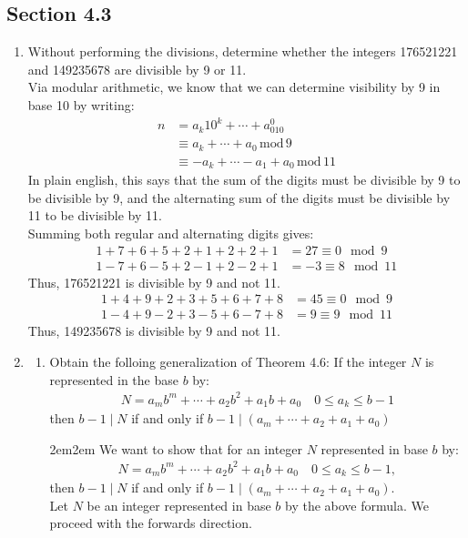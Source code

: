 \documentclass[10pt,oneside]{book}
\newcommand{\gspc}{\vspace{0.13cm}} %
\newcommand{\gline}{\gspc\\} %
\newcommand{\gmod}{\,\text{mod}\,}
\let\endoldproof\endproof
\renewenvironment{proof}[1][\proofname]
  {\vspace{0.2cm}\begin{adjustwidth}{2em}{2em}
   \oldproof[#1]}
  {\endoldproof
\end{adjustwidth}}
\begin{document}
\subsection*{Section 4.3}
\begin{enumerate}
	\item [4.] Without performing the divisions, determine whether the integers 176521221 and 149235678 are divisible by 9 or 11. \gline
	Via modular arithmetic, we know that we can determine visibility by 9 in base 10 by writing:
	\begin{align*}
		n &= a_k10^k+\cdots+a_010^0\\
		&\equiv a_k + \cdots +a_0 \gmod 9\\
		&\equiv -a_k + \cdots -a_1+a_0 \gmod 11
	\end{align*}
	In plain english, this says that the sum of the digits must be divisible by 9 to be divisible by 9, and the alternating sum of the digits must be divisible by 11 to be divisible by 11. \gline
	Summing both regular and alternating digits gives:
	\begin{align*}
		1+7+6+5+2+1+2+2+1 &= 27\equiv 0 \mod 9\\
		1-7+6-5+2-1+2-2+1 &= -3 \equiv 8\mod 11
	\end{align*}
	Thus, 176521221 is divisible by 9 and not 11.
	\begin{align*}
		1+4+9+2+3+5+6+7+8 &= 45\equiv 0 \mod 9\\
		1-4+9-2+3-5+6-7+8 &= 9 \equiv 9 \mod 11
	\end{align*}
	Thus, 149235678 is divisible by 9 and not 11. 
	\item [5.] \begin{enumerate}
		\item Obtain the folloing generalization of Theorem 4.6: If the integer $N$ is represented in the base $b$ by:
		\begin{align*}
			N = a_mb^m+\cdots + a_2b^2 + a_1b + a_0\quad 0 \le a_k \le b - 1
		\end{align*}
		then $b -1 \mid N$ if and only if $b- 1\mid (a_m+\cdots+a_2+a_1+a_0)$ 
		\begin{proof}
			We want to show that for an integer $N$ represented in base $b$ by:
			\begin{align*}
				N = a_mb^m+\cdots + a_2b^2 + a_1b + a_0\quad 0 \le a_k \le b - 1,
			\end{align*}
			then $b-1\mid N$ if and only if $b-1 \mid (a_m+\cdots+a_2+a_1+a_0)$.\gline
			Let $N$ be an integer represented in base $b$ by the above formula. We proceed with the forwards direction.

\end{proof}
\end{enumerate}
\end{enumerate}
\end{document}
